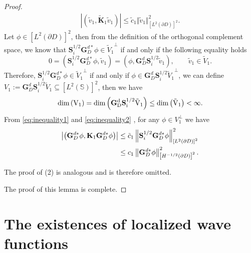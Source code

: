 \documentclass[11pt,reqno,twoside]{amsart}
\theoremstyle{definition}
\theoremstyle{remark}
\numberwithin{equation}{section}
\begin{document}
\begin{proof}
	 \begin{align}\label{eq:inequality2}
	 	\left|\left( \tilde v_1,\mathbf {\tilde K}_1 \tilde v_1 \right) \right| \leq \tilde c_1 \Vert \tilde v_1\Vert^2_{\left[L^2\left(\partial D\right) \right] ^2}.
	 \end{align}
	Let $\phi \in \left[L^2\left(\partial D\right) \right] ^2$, then from the definition of the orthogonal complement space, we know that $\mathbf S^{1/2}_i \mathbf G_D^{d*} \phi \in {\tilde V_1}^{\perp}$ if and only if the following equality holds
	$$
	0=\left( \mathbf S^{1/2}_i \mathbf G_D^{d*} \phi,\tilde v_1 \right)=\left( \phi, \mathbf G_D^d \mathbf S^{1/2}_i \tilde v_1 \right) ,\qquad \tilde v_1 \in \tilde V_1.
	$$
	Therefore, $\mathbf S^{1/2}_i \mathbf G_D^{d*} \phi \in {\tilde V_1}^{\perp}$ if and only if $\phi \in {\mathbf G_D^d \mathbf S^{1/2}_i \tilde V_1}^{\perp}$, we can define $V_1:=\mathbf G_D^d \mathbf S^{1/2}_i \tilde V_1 \subseteq \left[L^2\left(\mathbb S\right) \right] ^2$, then we have
	$$
	\rm {dim}\left( V_1 \right) =\rm {dim}\left( \mathbf G_D^d \mathbf S^{1/2}_i \tilde V_1\right) \leq \rm {dim}\left( \tilde V_1\right) < \infty.
	$$
	From  \eqref{eq:inequality1} and \eqref{eq:inequality2} , for any $\phi \in V_1^{\perp}$ we have
\begin{equation}\notag\begin{aligned}
	\left|\left( \mathbf G_D^{d*} \mathbf {\phi} , \mathbf {K}_1\mathbf G_D^{d*} \mathbf {\phi}\right)\right| 
	&\leq \tilde c_1 \left\|\mathbf S^{1/2}_i \mathbf G_D^{d*} \phi\right\|^2_{\left[L^2\left(\partial D\right) \right] ^2}\\
	&\leq c_1\left\|\mathbf G_D^{d*} \phi\right\|^2_{\left[H^{-1/2}\left(\partial D\right) \right] ^2}.
	\end{aligned}\end{equation}

The proof of (2) is analogous and is therefore omitted.

The proof of this lemma is complete.
\end{proof}
	
	
	
\section{The existences of localized wave functions}\label{sec:LocalizedWaveFunction}
\end{document}
